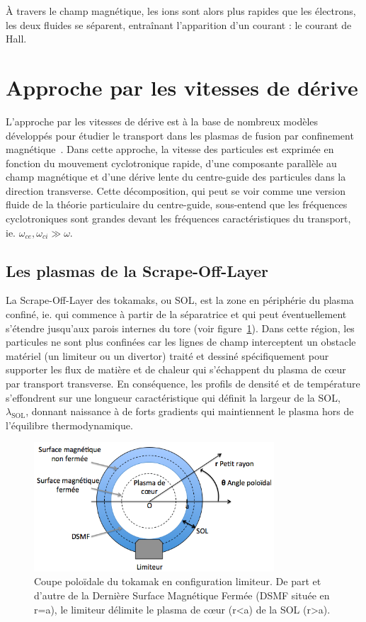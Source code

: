 \begin{refsection}
À travers le champ magnétique, les ions sont alors plus rapides que les
électrons, les deux fluides se séparent, entraînant l'apparition d'un
courant : le courant de Hall. 

\section{Approche par les vitesses de dérive}
\label{vitessesDerive}
L'approche par les vitesses de dérive est à la base de nombreux modèles
développés pour étudier le transport dans les plasmas de fusion par
confinement magnétique~\parencite{Garcia,Bisai,Tamain}. Dans cette approche, la
vitesse des particules est exprimée en fonction du mouvement cyclotronique rapide, d'une composante
parallèle au champ magnétique et d'une dérive lente du centre-guide des particules dans
la direction transverse. Cette décomposition, qui peut se voir comme une
version fluide de la théorie particulaire du centre-guide, sous-entend que les
fréquences cyclotroniques sont grandes devant les fréquences caractéristiques du
transport, ie. $\omega_{ce},\omega_{ci}\gg\omega$. 
 
\subsection{Les plasmas de la Scrape-Off-Layer}
La Scrape-Off-Layer des tokamaks, ou SOL, est la zone en
périphérie du plasma confiné, ie. qui commence à partir de la séparatrice et qui
peut éventuellement s'étendre jusqu'aux parois internes du tore (voir
figure~\ref{SOL}). Dans cette région, les
particules ne sont plus confinées car les lignes de champ interceptent un
obstacle matériel (un limiteur ou un divertor) traité et dessiné spécifiquement
pour supporter les flux de matière et de chaleur qui s'échappent du plasma de
c\oe ur par transport transverse.
En conséquence, les profils de densité et de température s'effondrent sur une
longueur caractéristique qui définit la largeur de la SOL, $\lambda_\text{SOL}$,
donnant naissance à de forts gradients qui maintiennent le plasma hors
de l'équilibre thermodynamique.

\begin{figure}[!htbp]
    \centering
	\includegraphics[width=0.8\textwidth]{figures/1-SOLLimiter.png}
	\caption{Coupe poloïdale du tokamak en configuration limiteur. De part et
	d'autre de la Dernière Surface Magnétique Fermée (DSMF située en r=a), le
	limiteur délimite le plasma de c\oe ur (r<a) de la SOL (r>a).}\label{SOL}
\end{figure}
 

\end{refsection}
